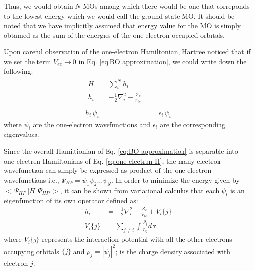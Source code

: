             Thus, we would obtain $N$ MOs among which there would be one that correponds to the lowest energy which we would call the ground state MO. It should be noted that we have implicitly assumed that energy value for the MO is simply obtained as the sum of the energies of the one-electron occupied orbitals.

            Upon careful observation of the one-electron Hamiltonian, Hartree noticed that if we set the term $V_{ee} \to 0$ in Eq. \eqref{eq:BO approximation}, we could write down the following:
            \begin{subequations}
                \begin{align}
                    \begin{split}
                        H &= \displaystyle\sum_i^N h_i\\
                        h_i &= -\frac{1}{2} \nabla^2_i - \frac{Z_k}{r_{ik}} \label{eq:one electron H}\\
                    \end{split}\\
                    h_i\,\psi_i\, &= \epsilon_i \, \psi_i \label{eq:one electron SE}
                \end{align}
            \end{subequations}
            where $\psi_i$ are the one-electron wavefunctions and $\epsilon_i$ are the corresponding eigenvalues.

            Since the overall Hamiltionian of Eq. \eqref{eq:BO approximation} is separable into one-electron Hamiltonians of Eq. \eqref{eq:one electron H}, the many electron wavefunction can simply be expressed as product of the one electron wavefunctions i.e., $\Psi_{HP} = \psi_1 \psi_2 \ldots \psi_N$. In order to minimize the energy given by $<\,\Psi_{HP}\, | H |\,\Psi_{HP}\,>$, it can be shown from variational calculus that each $\psi_i$ is an eigenfunction of its own operator defined as:
            \begin{equation}\label{eq:correct Hamiltonian}
                \begin{aligned}
                    h_i &= -\frac{1}{2} \nabla^2_i - \frac{Z_k}{r_{ik}} + V_i \{j\}\\
                    V_i \{j\} &= \displaystyle\sum_{j \ne i} \int \frac{\rho_j}{r_{ij}} d\,\mathbf{r}
                \end{aligned}
            \end{equation}
            where $V_i \{j\}$ represents the interaction potential with all the other electrons occupying orbitals $\{j\}$ and $\rho_j = |\psi_j|^2$; is the charge density associated with electron $j$.

